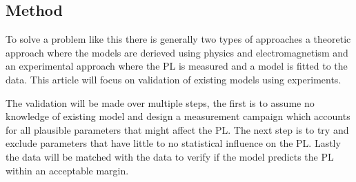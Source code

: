 \subsection{Method}
To solve a problem like this there is generally two types of approaches a theoretic approach where the models are derieved using physics and electromagnetism and an experimental approach where the PL is measured and a model is fitted to the data. This article will focus on validation of existing models using experiments. 

The validation will be made over multiple steps, the first is to assume no knowledge of existing model and design a measurement campaign which accounts for all plausible parameters that might affect the PL. The next step is to try and exclude parameters that have little to no statistical influence on the PL. Lastly the data will be matched with the data to verify if the model predicts the PL within an acceptable margin.  